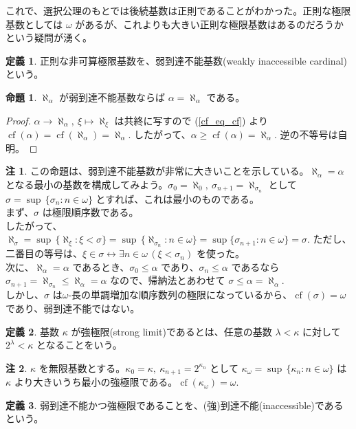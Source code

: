 \documentclass{jsarticle}
\theoremstyle{definition}
\newtheorem*{definition*}{定義}
\newtheorem{proposition}[theorem]{命題}
\newtheorem{remark}{注}[section]
\begin{document}
    \vspace{1.0ex}
    これで、選択公理のもとでは後続基数は正則であることがわかった。正則な極限基数としては $\omega$ があるが、これよりも大きい正則な極限基数はあるのだろうかという疑問が湧く。
    
    \begin{definition*}
        正則な非可算極限基数を、弱到達不能基数(weakly inaccessible cardinal)という。
    \end{definition*}
    \begin{proposition}
        $\aleph_\alpha$ が弱到達不能基数ならば $\alpha = \aleph_\alpha$ である。
    \end{proposition}
    \begin{proof}
        $\alpha \rightarrow \aleph_\alpha, \ \xi \mapsto \aleph_\xi$ は共終に写すので (\ref{cf_eq_cf}) より $\operatorname{cf}(\alpha) = \operatorname{cf}(\aleph_\alpha) = \aleph_\alpha.$ したがって、$\alpha \geq \operatorname{cf}(\alpha) = \aleph_\alpha.$ 逆の不等号は自明。
    \end{proof}
    \begin{remark}
        この命題は、弱到達不能基数が非常に大きいことを示している。$\aleph_\alpha = \alpha$ となる最小の基数を構成してみよう。$\sigma_0 = \aleph_0, \ \sigma_{n+1} = \aleph_{\sigma_n}$ として $\sigma = \sup \, \{\sigma_n : n \in \omega\}$ とすれば、これは最小のものである。\\
        まず、$\sigma$ は極限順序数である。\\
        したがって、$\aleph_\sigma = \sup \, \{\aleph_\xi : \xi < \sigma\} = \sup \, \{\aleph_{\sigma_n} : n \in \omega\} = \sup \{\sigma_{n+1} : n \in \omega\} = \sigma.$ ただし、二番目の等号は、$\xi \in \sigma \leftrightarrow \exists n \in \omega \, (\xi < \sigma_n)$ を使った。\\
        次に、$\aleph_\alpha = \alpha$ であるとき、$\sigma_0 \leq \alpha$ であり、$\sigma_n \leq \alpha$ であるなら $\sigma_{n+1} = \aleph_{\sigma_n} \leq \aleph_{\alpha} = \alpha$ なので、帰納法とあわせて $\sigma \leq \alpha = \aleph_\alpha.$\\
        しかし、$\sigma$ は$\omega$-長の単調増加な順序数列の極限になっているから、$\operatorname{cf}(\sigma) = \omega$ であり、弱到達不能ではない。
    \end{remark}
    
    \vspace{1.0ex}
    
    \begin{definition*}
        基数 $\kappa$ が強極限(strong limit)であるとは、任意の基数 $\lambda < \kappa$ に対して $2^\lambda < \kappa$ となることをいう。
    \end{definition*}
    \begin{remark}
        $\kappa$ を無限基数とする。$\kappa_0 = \kappa, \ \kappa_{n+1} = 2^{\kappa_{n}}$ として $\kappa_{\omega} = \sup \, \{\kappa_n : n \in \omega\}$ は $\kappa$ より大きいうち最小の強極限である。$\operatorname{cf}(\kappa_\omega) = \omega.$
    \end{remark}
    \begin{definition*}
        弱到達不能かつ強極限であることを、(強)到達不能(inaccessible)であるという。
    \end{definition*}
    
\end{document}
